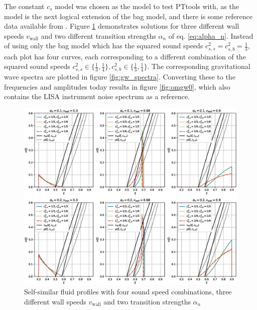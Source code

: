 The constant $c_s$ model was chosen as the model to test PTtools with,
as the model is the next logical extension of the bag model,
and there is some reference data available from \cites{giese_2020}{giese_2021}.
Figure \ref{fig:fluid_profiles} demonstrates solutions for three different wall speeds $v_\text{wall}$ and two different transition strengths $\alpha_n$ of eq. \eqref{eq:alpha_n}.
Instead of using only the bag model which has the squared sound speeds $c_{s,s}^2 = c_{s,b}^2 = \frac{1}{3}$,
each plot has four curves, each corresponding to a different combination of the squared sound speeds
$c_{s,s}^2 \in \{ \frac{1}{3}, \frac{1}{4} \}, c_{s,b}^2 \in \{ \frac{1}{3}, \frac{1}{4} \}$.
The corresponding gravitational wave spectra are plotted in figure \ref{fig:gw_spectra}.
Converting these to the frequencies and amplitudes today results in figure \ref{fig:omgw0},
which also contains the LISA instrument noise spectrum as a reference.

\begin{figure}[ht!]
\centering
\includegraphics[width=\textwidth]{fig/const_cs_gw_v.eps}
\caption{Self-similar fluid profiles with four sound speed combinations, three different wall speeds $v_\text{wall}$ and two transition strengths $\alpha_n$}
\label{fig:fluid_profiles}
\end{figure}

